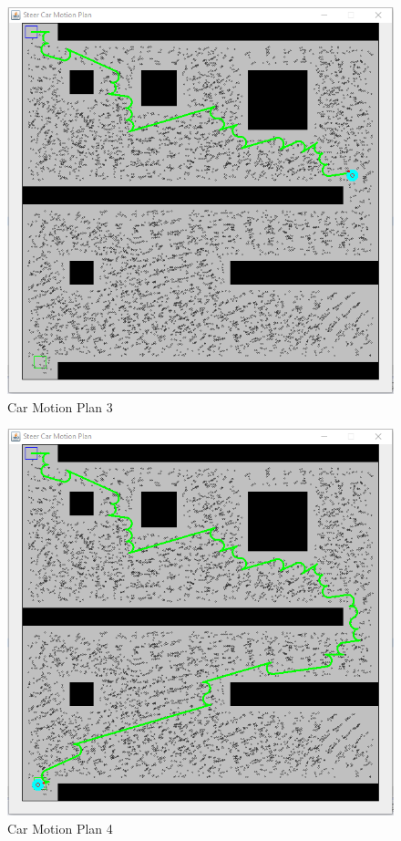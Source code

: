 \documentclass{article}
\begin{document}
\begin{figure}[!htb]
\centering
\includegraphics[width=\linewidth]{car_13}
\caption{Car Motion Plan 3}
\end{figure}
\begin{figure}[!htb]
\centering
\includegraphics[width=\linewidth]{car_14}
\caption{Car Motion Plan 4}
\end{figure}
\end{document}
